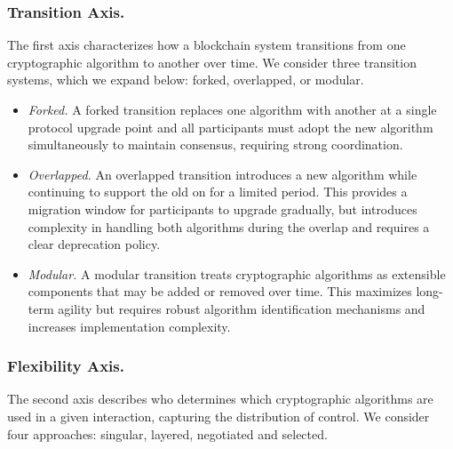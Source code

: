 
\subsubsection{Transition Axis.} The first axis characterizes how a blockchain system transitions from one cryptographic algorithm to another over time. 
We consider three transition systems, which we expand below: forked, overlapped, or modular. 


\begin{itemize}
    \item \emph{Forked.} A forked transition replaces one algorithm with another at a single protocol upgrade point and all participants must adopt the new algorithm simultaneously to maintain consensus, requiring strong coordination.
    \item \emph{Overlapped.} An overlapped transition introduces a new algorithm while continuing to support the old on for a limited period. 
This provides a migration window for participants to upgrade gradually, but introduces complexity in handling both algorithms during the overlap and requires a clear deprecation policy.
    \item \emph{Modular.} A modular transition treats cryptographic algorithms as extensible components that may be added or removed over time.
 This maximizes long-term agility but requires robust algorithm identification mechanisms and increases implementation complexity.
\end{itemize}

\subsubsection{Flexibility Axis.} The second axis describes who determines which cryptographic algorithms are used in a given interaction, capturing the distribution of control. 
We consider four approaches: singular, layered, negotiated and selected.

